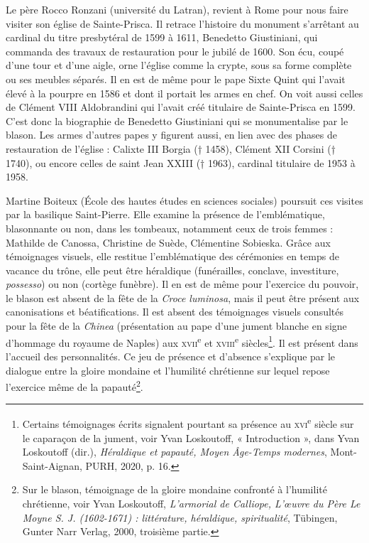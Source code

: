 \documentclass[12pt,twoside,openany]{book}
\begin{document}
Le père Rocco Ronzani (université du Latran), revient à Rome pour nous faire visiter son église de Sainte-Prisca. Il retrace l’histoire du monument s’arrêtant au cardinal du titre presbytéral de 1599 à 1611, Benedetto Giustiniani, qui commanda des travaux de restauration pour le jubilé de 1600. Son écu, coupé d’une tour et d’une aigle, orne l’église comme la crypte, sous sa forme complète ou ses meubles séparés. Il en est de même pour le pape Sixte Quint qui l’avait élevé à la pourpre en 1586 et dont il portait les armes en chef. On voit aussi celles de Clément VIII Aldobrandini qui l’avait créé titulaire de Sainte-Prisca en 1599. C’est donc la biographie de Benedetto Giustiniani qui se monumentalise par le blason. Les armes d’autres papes y figurent aussi, en lien avec des phases de restauration de l’église : Calixte III Borgia († 1458), Clément XII Corsini († 1740), ou encore celles de saint Jean XXIII († 1963), cardinal titulaire de 1953 à 1958.

Martine Boiteux (École des hautes études en sciences sociales) poursuit ces visites par la basilique Saint-Pierre. Elle examine la présence de l’emblématique, blasonnante ou non, dans les tombeaux, notamment ceux de trois femmes : Mathilde de Canossa, Christine de Suède, Clémentine Sobieska. Grâce aux témoignages visuels, elle restitue l’emblématique des cérémonies en temps de vacance du trône, elle peut être héraldique (funérailles, conclave, investiture, \textit{possesso}) ou non (cortège funèbre). Il en est de même pour l’exercice du pouvoir, le blason est absent de la fête de la \textit{Croce luminosa}, mais il peut être présent aux canonisations et béatifications. Il est absent des témoignages visuels consultés pour la fête de la \textit{Chinea} (présentation au pape d’une jument blanche en signe d’hommage du royaume de Naples) aux \textsc{xvii}\textsuperscript{e} et \textsc{xviii}\textsuperscript{e} siècles\footnote{Certains témoignages écrits signalent pourtant sa présence au \textsc{xvi}\textsuperscript{e} siècle sur le caparaçon de la jument, voir Yvan Loskoutoff, « Introduction », dans Yvan Loskoutoff (dir.), \textit{Héraldique et papauté, Moyen Âge-Temps modernes}, Mont-Saint-Aignan, PURH, 2020, p. 16.}. Il est présent dans l’accueil des personnalités. Ce jeu de présence et d’absence s’explique par le dialogue entre la gloire mondaine et l’humilité chrétienne sur lequel repose l’exercice même de la papauté\footnote{Sur le blason, témoignage de la gloire mondaine confronté à l’humilité chrétienne, voir Yvan Loskoutoff, \textit{L’armorial de Calliope, L’œuvre du Père Le Moyne S. J. (1602-1671) : littérature, héraldique, spiritualité}, Tübingen, Gunter Narr Verlag, 2000, troisième partie.}.
\end{document}
